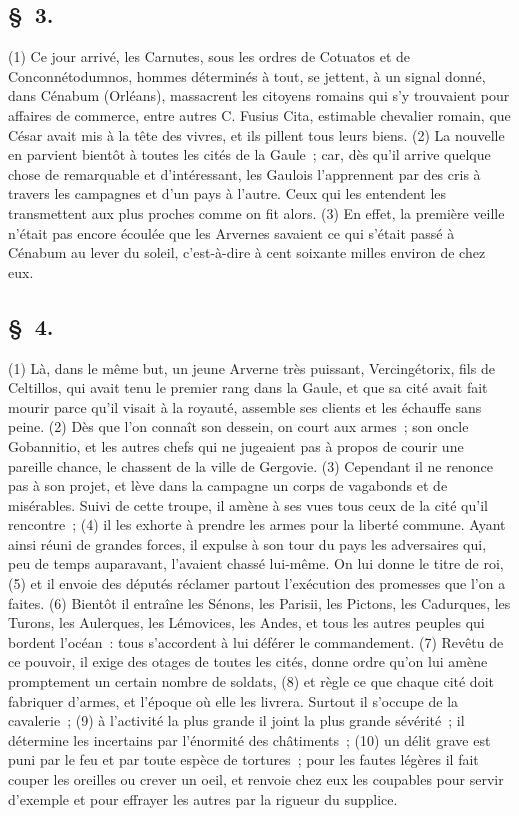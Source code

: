\documentclass[french,twoside]{book} %
\begin{document}
\subsection[{§ 3.}]{ \textsc{§ 3.} }
\noindent (1) Ce jour arrivé, les Carnutes, sous les ordres de Cotuatos et de Conconnétodumnos, hommes déterminés à tout, se jettent, à un signal donné, dans Cénabum (Orléans), massacrent les citoyens romains qui s’y trouvaient pour affaires de commerce, entre autres C. Fusius Cita, estimable chevalier romain, que César avait mis à la tête des vivres, et ils pillent tous leurs biens. (2) La nouvelle en parvient bientôt à toutes les cités de la Gaule ; car, dès qu’il arrive quelque chose de remarquable et d’intéressant, les Gaulois l’apprennent par des cris à travers les campagnes et d’un pays à l’autre. Ceux qui les entendent les transmettent aux plus proches comme on fit alors. (3) En effet, la première veille n’était pas encore écoulée que les Arvernes savaient ce qui s’était passé à Cénabum au lever du soleil, c’est-à-dire à cent soixante milles environ de chez eux.
\subsection[{§ 4.}]{ \textsc{§ 4.} }
\noindent (1) Là, dans le même but, un jeune Arverne très puissant, Vercingétorix, fils de Celtillos, qui avait tenu le premier rang dans la Gaule, et que sa cité avait fait mourir parce qu’il visait à la royauté, assemble ses clients et les échauffe sans peine. (2) Dès que l’on connaît son dessein, on court aux armes ; son oncle Gobannitio, et les autres chefs qui ne jugeaient pas à propos de courir une pareille chance, le chassent de la ville de Gergovie. (3) Cependant il ne renonce pas à son projet, et lève dans la campagne un corps de vagabonds et de misérables. Suivi de cette troupe, il amène à ses vues tous ceux de la cité qu’il rencontre ; (4) il les exhorte à prendre les armes pour la liberté commune. Ayant ainsi réuni de grandes forces, il expulse à son tour du pays les adversaires qui, peu de temps auparavant, l’avaient chassé lui-même. On lui donne le titre de roi, (5) et il envoie des députés réclamer partout l’exécution des promesses que l’on a faites. (6) Bientôt il entraîne les Sénons, les Parisii, les Pictons, les Cadurques, les Turons, les Aulerques, les Lémovices, les Andes, et tous les autres peuples qui bordent l’océan : tous s’accordent à lui déférer le commandement. (7) Revêtu de ce pouvoir, il exige des otages de toutes les cités, donne ordre qu’on lui amène promptement un certain nombre de soldats, (8) et règle ce que chaque cité doit fabriquer d’armes, et l’époque où elle les livrera. Surtout il s’occupe de la cavalerie ; (9) à l’activité la plus grande il joint la plus grande sévérité ; il détermine les incertains par l’énormité des châtiments ; (10) un délit grave est puni par le feu et par toute espèce de tortures ; pour les fautes légères il fait couper les oreilles ou crever un oeil, et renvoie chez eux les coupables pour servir d’exemple et pour effrayer les autres par la rigueur du supplice.
\end{document}
